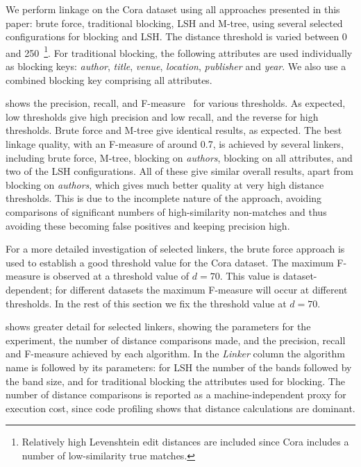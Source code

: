\documentclass{llncs}
\begin{document}
We perform linkage on the Cora dataset using all approaches presented in
this paper: brute force, traditional blocking, LSH and M-tree, using
several selected configurations for blocking and LSH. The distance
threshold is varied between 0 and 250~\footnote{Relatively high
Levenshtein edit distances are included since Cora includes a number of
low-similarity true matches.}. For traditional blocking, the following
attributes are used individually as blocking keys: \emph{author},
\emph{title}, \emph{venue}, \emph{location}, \emph{publisher} and
\emph{year}. We also use a combined blocking key comprising all
attributes.

 shows the precision, recall, and
F-measure~\cite{Chr12} for various thresholds. As expected, low
thresholds give high precision and low recall, and the reverse for high
thresholds. Brute force and M-tree give identical results, as expected.
The best linkage quality, with an F-measure of around 0.7, is achieved
by several linkers, including brute force, M-tree, blocking on
\emph{authors}, blocking on all attributes, and two of the LSH
configurations. All of these give similar overall results, apart from
blocking on \emph{authors}, which gives much better quality at very high
distance thresholds. This is due to the incomplete nature of the
approach, avoiding comparisons of significant numbers of high-similarity
non-matches and thus avoiding these becoming false positives and keeping
precision high.

For a more detailed investigation of selected linkers, the brute force
approach is used to establish a good threshold value for the Cora
dataset. The maximum F-measure is observed at a threshold value of
$d=70$. This value is dataset-dependent; for different datasets the
maximum F-measure will occur at different thresholds. In the rest of
this section we fix the threshold value at $d=70$.

 shows greater detail for selected
linkers, showing the parameters for the experiment, the number of
distance comparisons made, and the precision, recall and F-measure
achieved by each algorithm. In the \emph{Linker} column the algorithm
name is followed by its parameters: for LSH the number of the bands
followed by the band size, and for traditional blocking the attributes
used for blocking. The number of distance comparisons is reported as a
machine-independent proxy for execution cost, since code profiling shows
that distance calculations are dominant.
\end{document}
